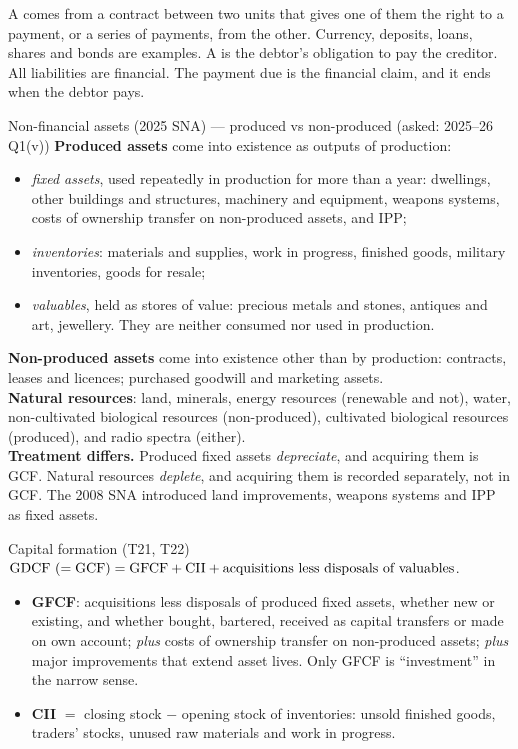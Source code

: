 A  comes from a contract between two units that gives one of them the right to
a payment, or a series of payments, from the other. Currency, deposits, loans, shares and bonds
are examples. A  is the debtor's obligation to pay the creditor. All liabilities are
financial. The payment due is the financial claim, and it ends when the debtor pays.

\begin{keybox}{Non-financial assets (2025 SNA) --- produced vs non-produced (asked: 2025--26 Q1(v))}
\small
\textbf{Produced assets} come into existence as outputs of production:
\begin{itemize}
\item \emph{fixed assets}, used repeatedly in production for more than a year: dwellings, other
  buildings and structures, machinery and equipment, weapons systems, costs of ownership transfer
  on non-produced assets, and IPP;
\item \emph{inventories}: materials and supplies, work in progress, finished goods, military
  inventories, goods for resale;
\item \emph{valuables}, held as stores of value: precious metals and stones, antiques and art,
  jewellery. They are neither consumed nor used in production.
\end{itemize}
\textbf{Non-produced assets} come into existence other than by production: contracts, leases and
licences; purchased goodwill and marketing assets.\\
\textbf{Natural resources}: land, minerals, energy resources (renewable and not), water,
non-cultivated biological resources (non-produced), cultivated biological resources (produced),
and radio spectra (either).\\[2pt]
\textbf{Treatment differs.} Produced fixed assets \emph{depreciate}, and acquiring them is GCF.
Natural resources \emph{deplete}, and acquiring them is recorded separately, not in GCF. The
2008 SNA introduced land improvements, weapons systems and IPP as fixed assets.
\end{keybox}

\begin{keybox}{Capital formation (T21, T22)}
\small
$\mathrm{GDCF}\ (=\mathrm{GCF}) = \mathrm{GFCF} + \mathrm{CII} + \text{acquisitions less disposals of valuables}$.
\begin{itemize}
\item \textbf{GFCF}: acquisitions less disposals of produced fixed assets, whether new or
  existing, and whether bought, bartered, received as capital transfers or made on own account;
  \emph{plus} costs of ownership transfer on non-produced assets; \emph{plus} major improvements
  that extend asset lives. Only GFCF is ``investment'' in the narrow sense.
\item \textbf{CII} $=$ closing stock $-$ opening stock of inventories: unsold finished goods,
  traders' stocks, unused raw materials and work in progress.
\end{itemize}
\end{keybox}

